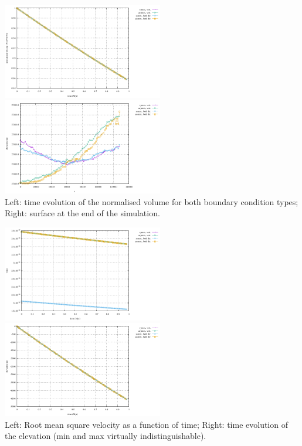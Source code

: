 \begin{center}
\includegraphics[width=7cm]{python_codes/fieldstone_54/images/exp2-3/volume.pdf}
\includegraphics[width=7cm]{python_codes/fieldstone_54/images/exp2-3/surface.pdf}\\
{\captionfont Left: time evolution of the normalised volume for both boundary condition types; Right: surface at the end of the simulation.}
\end{center}


\begin{center}
\includegraphics[width=7cm]{python_codes/fieldstone_54/images/exp2-3/vrms.pdf}
\includegraphics[width=7cm]{python_codes/fieldstone_54/images/exp2-3/elevation.pdf}\\
{\captionfont Left: Root mean square velocity as a function of time; Right: time evolution of the elevation (min and max virtually indistinguishable).} 
\end{center}



